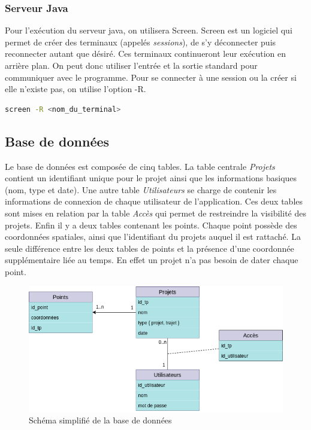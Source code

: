 \subsubsection{Serveur Java}

Pour l'exécution du serveur java, on utilisera Screen.
Screen est un logiciel qui permet de créer des terminaux (appelés \emph{sessions}), de s'y déconnecter puis reconnecter autant que désiré.
Ces terminaux continueront leur exécution en arrière plan. On peut donc utiliser l'entrée et la sortie standard pour communiquer avec le programme.
Pour se connecter à une session ou la créer si elle n'existe pas, on utilise l'option -R.
\begin{lstlisting}[language=bash]
    screen -R <nom_du_terminal>
\end{lstlisting}

\subsection{Base de données}
Le base de données est composée de cinq tables. La table centrale \emph{Projets} contient un identifiant unique pour le projet ainsi que les informations basiques (nom, type et date).
Une autre table \emph{Utilisateurs} se charge de contenir les informations de connexion de chaque utilisateur de l'application. Ces deux tables sont mises en relation par la table \emph{Accès} qui permet de restreindre la visibilité des projets.
Enfin il y a deux tables contenant les points. Chaque point possède des coordonnées spatiales, ainsi que l'identifiant du projets auquel il est rattaché. La seule différence entre les deux tables de points et la présence d'une coordonnée supplémentaire liée au temps. En effet un projet n'a pas besoin de dater chaque point.
\begin{figure}[ht]
    \label{Schéma de la base de données}
    \centering
    \includegraphics[scale=0.6]{images/bdd.png}
    \caption{Schéma simplifié de la base de données}
\end{figure}

